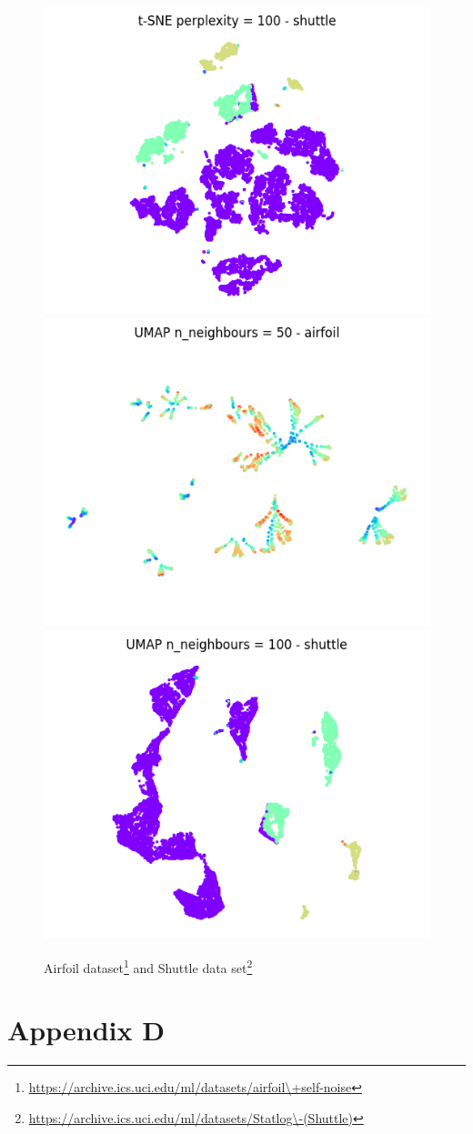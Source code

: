 \documentclass{l4proj}
\begin{document}
\begin{appendices}
\begin{figure}[htb]
    \includegraphics[width=0.4\linewidth]{images/tsne_umap_compare/tsne_shuttle.png} \\
    \includegraphics[width=0.4\linewidth]{images/tsne_umap_compare/umapairfoil.png}
    \includegraphics[width=0.4\linewidth]{images/tsne_umap_compare/umap_shuttle.png} \\



    \caption{ Airfoil dataset\footnote{\url{https://archive.ics.uci.edu/ml/datasets/airfoil\+self-noise}} and Shuttle data set\footnote{\url{https://archive.ics.uci.edu/ml/datasets/Statlog\-(Shuttle)}}
    }

    \label{fig:init_demo} 
\end{figure}

\chapter{Appendix D}
\label{appendix d}


\end{appendices}
\end{document}
